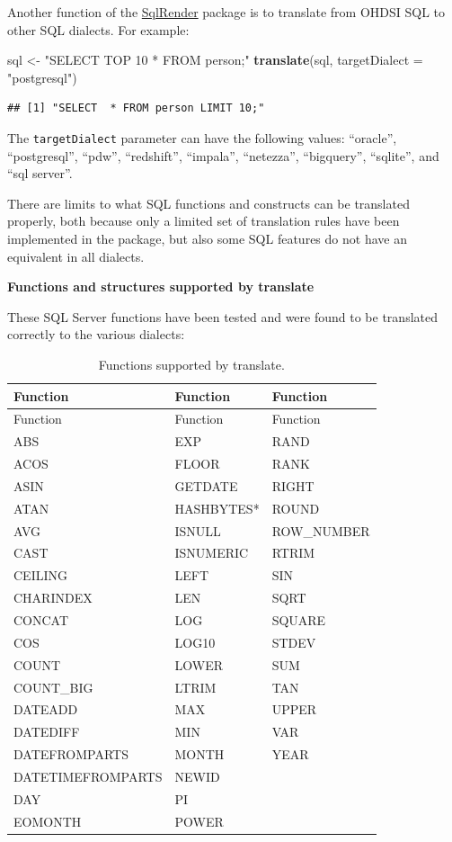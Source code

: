\documentclass[11pt]{book}
\newenvironment{Shaded}{\begin{snugshade}}{\end{snugshade}}
\newcommand{\KeywordTok}[1]{\textcolor[rgb]{0.13,0.29,0.53}{\textbf{#1}}}
\newcommand{\DataTypeTok}[1]{\textcolor[rgb]{0.13,0.29,0.53}{#1}}
\newcommand{\StringTok}[1]{\textcolor[rgb]{0.31,0.60,0.02}{#1}}
\newcommand{\NormalTok}[1]{#1}
\begin{document}
Another function of the
\href{https://ohdsi.github.io/SqlRender/}{SqlRender} package is to
translate from OHDSI SQL to other SQL dialects. For example:

\begin{Shaded}
\begin{Highlighting}[]
\NormalTok{sql <-}\StringTok{ "SELECT TOP 10 * FROM person;"}
\KeywordTok{translate}\NormalTok{(sql, }\DataTypeTok{targetDialect =} \StringTok{"postgresql"}\NormalTok{)}
\end{Highlighting}
\end{Shaded}

\begin{verbatim}
## [1] "SELECT  * FROM person LIMIT 10;"
\end{verbatim}

The \texttt{targetDialect} parameter can have the following values:
``oracle'', ``postgresql'', ``pdw'', ``redshift'', ``impala'',
``netezza'', ``bigquery'', ``sqlite'', and ``sql server''.

There are limits to what SQL functions and constructs can be translated
properly, both because only a limited set of translation rules have been
implemented in the package, but also some SQL features do not have an
equivalent in all dialects.

\textbf{Functions and structures supported by translate}

These SQL Server functions have been tested and were found to be
translated correctly to the various dialects:

\begin{longtable}[]{@{}lll@{}}
\caption{\label{tab:sqlFunctions} Functions supported by
translate.}\tabularnewline
\toprule
Function & Function & Function\tabularnewline
\midrule
\endfirsthead
\toprule
Function & Function & Function\tabularnewline
\midrule
\endhead
ABS & EXP & RAND\tabularnewline
ACOS & FLOOR & RANK\tabularnewline
ASIN & GETDATE & RIGHT\tabularnewline
ATAN & HASHBYTES* & ROUND\tabularnewline
AVG & ISNULL & ROW\_NUMBER\tabularnewline
CAST & ISNUMERIC & RTRIM\tabularnewline
CEILING & LEFT & SIN\tabularnewline
CHARINDEX & LEN & SQRT\tabularnewline
CONCAT & LOG & SQUARE\tabularnewline
COS & LOG10 & STDEV\tabularnewline
COUNT & LOWER & SUM\tabularnewline
COUNT\_BIG & LTRIM & TAN\tabularnewline
DATEADD & MAX & UPPER\tabularnewline
DATEDIFF & MIN & VAR\tabularnewline
DATEFROMPARTS & MONTH & YEAR\tabularnewline
DATETIMEFROMPARTS & NEWID &\tabularnewline
DAY & PI &\tabularnewline
EOMONTH & POWER &\tabularnewline
\bottomrule
\end{longtable}
\end{document}
